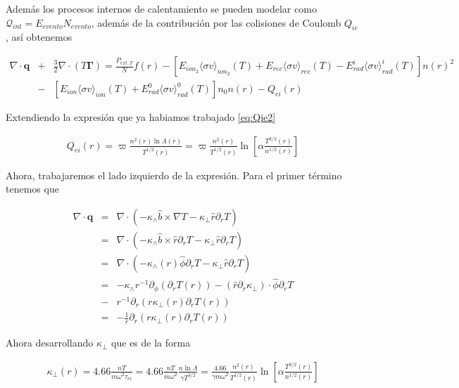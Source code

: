Además los procesos internos de calentamiento se pueden modelar como $\mathcal{Q}_{int} = E_{evento}N_{evento}$, además de la contribuci\'on por las colisiones de Coulomb $Q_{ie}$, as\'i obtenemos

\begin{eqnarray}
  \nabla\cdot\textbf{q} &+& \frac{3}{2}\nabla\cdot(T\pmb{\Gamma}) = \frac{P_{ext,T}}{N}f(r) -  [E_{ion_2}\langle\sigma v\rangle_{ion_2}(T) + E_{rec}\langle \sigma v\rangle_{rec}(T) - E_{rad}^i\langle\sigma v\rangle_{rad}^i(T)]n(r)^2 \nonumber \\ &-& [E_{ion}\langle\sigma v\rangle_{ion}(T)+ E_{rad}^0\langle\sigma v\rangle_{rad}^0(T)]n_0n(r) - Q_{ei}(r)
\end{eqnarray}

Extendiendo la expresi\'on que ya habiamos trabajado \eqref{eq:Qie2}

\begin{eqnarray*}
  Q_{ei}(r) = \varpi \frac{n^2(r)\ln{\Lambda}(r)}{T^{1/2}(r)} = \varpi\frac{n^2(r)}{T^{1/2}(r)}\ln\left[\alpha \frac{T^{3/2}(r)}{n^{1/2}(r)}\right]
\end{eqnarray*}

Ahora, trabajaremos el lado izquierdo de la expresi\'on. Para el primer t\'ermino tenemos que

\begin{eqnarray}
  \nabla\cdot\textbf{q} &=& \nabla\cdot(-\kappa_\wedge\hat{b}\times\nabla T - \kappa_\perp\hat{r}\partial_r T) \nonumber\\
                        &=& \nabla\cdot(-\kappa_\wedge\hat{b}\times\hat{r}\partial_r T - \kappa_\perp\hat{r}\partial_r T) \nonumber \\
                        &=& \nabla\cdot(-\kappa_\wedge(r)\hat{\phi}\partial_r T - \kappa_\perp\hat{r}\partial_r T) \nonumber\\
                        &=& -\kappa_\wedge r^{-1} \partial_\phi (\partial_r T(r)) - (\hat{r} \partial_r \kappa_\perp)\cdot \hat{\phi}\partial_r T \nonumber\\ 
                        &-& r^{-1}\partial_r(r \kappa_\perp (r) \partial_r T(r)) \nonumber\\
                        &=& - \frac{1}{r}\partial_r(r \kappa_\perp (r) \partial_r T(r))
\end{eqnarray}

Ahora desarrollando $\kappa_\perp$ que es de la forma \cite{helander2005}

\begin{eqnarray} 
  \kappa_\perp(r) = 4.66\frac{nT}{m\omega^2\tau_{ei}} = 4.66\frac{nT}{m\omega^2}\frac{n\ln\Lambda}{\gamma T^{3/2}} = \frac{4.66}{\gamma m\omega^2}\frac{n^2(r)}{T^{1/2}(r)}\ln\left[\alpha \frac{T^{3/2}(r)}{n^{1/2}(r)}\right]
\end{eqnarray}

